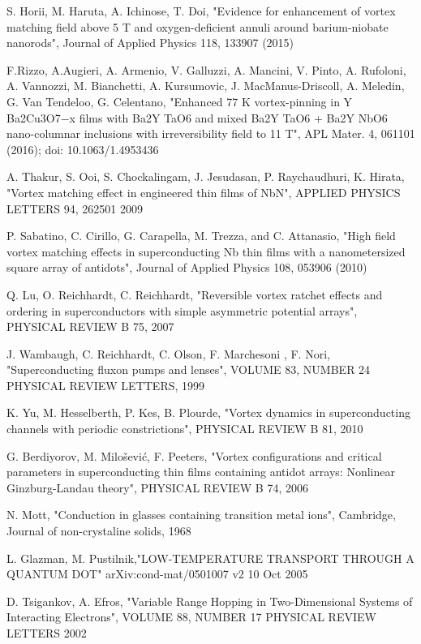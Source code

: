 \begin{thebibliography}{10}
 S. Horii, M. Haruta, A. Ichinose, T. Doi, "Evidence for enhancement of vortex matching field above 5 T and oxygen-deficient annuli around barium-niobate nanorods", Journal of Applied Physics 118, 133907 (2015)

 F.Rizzo, A.Augieri, A. Armenio, V. Galluzzi, A. Mancini, V. Pinto, A. Rufoloni, A. Vannozzi, M. Bianchetti, A. Kursumovic, J. MacManus-Driscoll, A. Meledin, G. Van Tendeloo, G. Celentano, "Enhanced 77 K vortex-pinning in Y Ba2Cu3O7−x films with Ba2Y TaO6 and mixed Ba2Y TaO6 + Ba2Y NbO6 nano-columnar inclusions with irreversibility field to 11 T", APL Mater. 4, 061101 (2016); doi: 10.1063/1.4953436

 A. Thakur, S. Ooi, S. Chockalingam, J. Jesudasan, P. Raychaudhuri, K. Hirata, "Vortex matching effect in engineered thin films of NbN", APPLIED PHYSICS LETTERS 94, 262501 2009

 P. Sabatino, C. Cirillo, G. Carapella, M. Trezza, and C. Attanasio, "High field vortex matching effects in superconducting Nb thin films with a nanometersized
square array of antidots", Journal of Applied Physics 108, 053906 (2010)

 Q. Lu, O. Reichhardt, C. Reichhardt, "Reversible vortex ratchet effects and ordering in superconductors with simple asymmetric potential arrays", PHYSICAL REVIEW B 75, 2007

 J. Wambaugh, C. Reichhardt, C. Olson, F. Marchesoni , F. Nori, "Superconducting fluxon pumps and lenses", VOLUME 83, NUMBER 24 PHYSICAL REVIEW LETTERS, 1999

 K. Yu, M. Hesselberth, P. Kes, B. Plourde, "Vortex dynamics in superconducting channels with periodic constrictions", PHYSICAL REVIEW B 81, 2010

 G. Berdiyorov, M. Milošević, F. Peeters, "Vortex configurations and critical parameters in superconducting thin films containing antidot arrays: Nonlinear Ginzburg-Landau theory", PHYSICAL REVIEW B 74, 2006

 N. Mott, "Conduction in glasses containing transition metal ions", Cambridge, Journal of non-crystaline solids, 1968

 L. Glazman, M. Pustilnik,"LOW-TEMPERATURE TRANSPORT THROUGH A QUANTUM DOT" arXiv:cond-mat/0501007 v2 10 Oct 2005

 D. Tsigankov, A. Efros, "Variable Range Hopping in Two-Dimensional Systems of Interacting Electrons", VOLUME 88, NUMBER 17 PHYSICAL REVIEW LETTERS 2002


\end{thebibliography}
